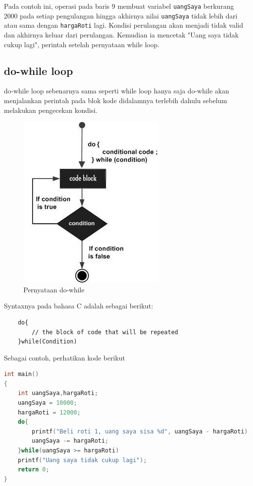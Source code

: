 Pada contoh ini, operasi pada baris 9 membuat variabel \verb|uangSaya| berkurang 2000 pada setiap pengulangan hingga akhirnya nilai \verb|uangSaya| tidak lebih dari atau sama dengan \verb|hargaRoti| lagi.
Kondisi perulangan akan menjadi tidak valid dan akhirnya keluar dari perulangan. Kemudian ia mencetak "Uang saya tidak cukup lagi", perintah setelah pernyataan while loop.
\subsection{do-while loop}
do-while loop sebenarnya sama seperti while loop hanya saja do-while akan menjalankan perintah pada blok kode didalamnya terlebih dahulu sebelum melakukan pengecekan kondisi.
\begin{figure}[H]
		\centering
		\includegraphics[width=0.4\linewidth]{../P2/img/dowhileloop.png}
		\caption{Pernyataan do-while}
		\label{fig:dowhileloop}
\end{figure}
Syntaxnya pada bahasa C adalah sebagai berikut:
\begin{verbatim}
    do{
        // the block of code that will be repeated
    }while(Condition)
\end{verbatim}
Sebagai contoh, perhatikan kode berikut
\begin{lstlisting}[language=c,caption = Contoh Penggunaan do-while,label=lst:dowhileexample01]
int main()
{
	int uangSaya,hargaRoti;
	uangSaya = 10000;
	hargaRoti = 12000;
	do{
	    printf("Beli roti 1, uang saya sisa %d", uangSaya - hargaRoti);
	    uangSaya -= hargaRoti;
	}while(uangSaya >= hargaRoti)
	printf("Uang saya tidak cukup lagi");
	return 0;
}
\end{lstlisting}  
